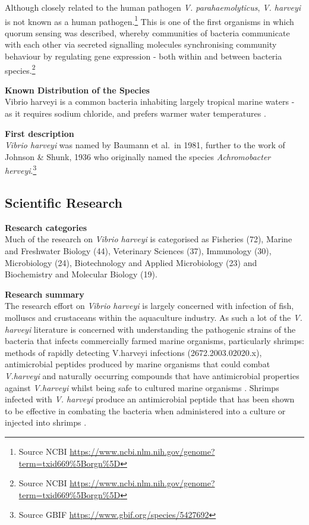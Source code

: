 \documentclass[]{book}
\theoremstyle{definition}
\theoremstyle{definition}
\theoremstyle{definition}
\theoremstyle{remark}
\begin{document}
Although closely related to the human pathogen \emph{V.
parahaemolyticus}, \emph{V. harveyi} is not known as a human
pathogen.\footnote{Source NCBI
  \url{https://www.ncbi.nlm.nih.gov/genome?term=txid669\%5Borgn\%5D}}
This is one of the first organisms in which quorum sensing was
described, whereby communities of bacteria communicate with each other
via secreted signalling molecules synchronising community behaviour by
regulating gene expression - both within and between bacteria
species.\footnote{Source NCBI
  \url{https://www.ncbi.nlm.nih.gov/genome?term=txid669\%5Borgn\%5D}}

\textbf{Known Distribution of the Species}\\
Vibrio harveyi is a common bacteria inhabiting largely tropical marine
waters - as it requires sodium chloride, and prefers warmer water
temperatures \citep{Austin_2006}.

\textbf{First description}\\
\emph{Vibrio harveyi} was named by Baumann et al.~in 1981, further to
the work of Johnson \& Shunk, 1936 who originally named the species
\emph{Achromobacter herveyi}.\footnote{Source GBIF
  \url{https://www.gbif.org/species/5427692}}

\hypertarget{scientific-research-8}{%
\subsection{Scientific Research}\label{scientific-research-8}}

\textbf{Research categories}\\
Much of the research on \emph{Vibrio harveyi} is categorised as
Fisheries (72), Marine and Freshwater Biology (44), Veterinary Sciences
(37), Immunology (30), Microbiology (24), Biotechnology and Applied
Microbiology (23) and Biochemistry and Molecular Biology (19).

\textbf{Research summary}\\
The research effort on \emph{Vibrio harveyi} is largely concerned with
infection of fish, molluscs and crustaceans within the aquaculture
industry. As such a lot of the \emph{V. harveyi} literature is concerned
with understanding the pathogenic strains of the bacteria that infects
commercially farmed marine organisms, particularly shrimps: methods of
rapidly detecting V.harveyi infections (2672.2003.02020.x),
antimicrobial peptides produced by marine organisms that could combat
\emph{V.harveyi} and naturally occurring compounds that have
antimicrobial properties against \emph{V.harveyi} whilst being safe to
cultured marine organisms \citep{Ponprateep_2009, Maneechote_2016}.
Shrimps infected with \emph{V. harveyi} produce an antimicrobial peptide
that has been shown to be effective in combating the bacteria when
administered into a culture or injected into shrimps
\citep{Ponprateep_2009}.
\end{document}

